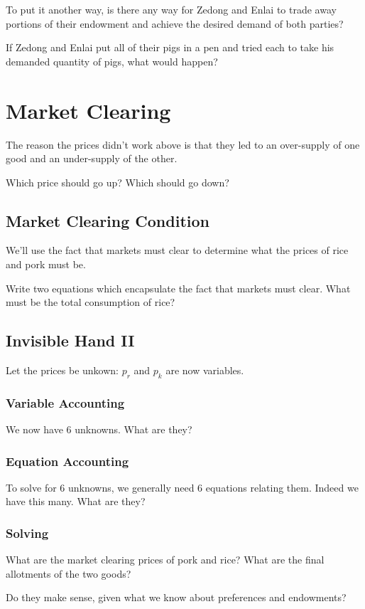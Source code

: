 \documentclass{article}
\begin{document}
To put it another way, is there any way for Zedong and Enlai to trade away portions of their endowment and achieve the desired demand of both parties?

If Zedong and Enlai put all of their pigs in a pen and tried each to take his demanded quantity of pigs, what would happen?

\section{Market Clearing}

The reason the prices didn't work above is that they led to an over-supply of one good and an under-supply of the other. 

Which price should go up? Which should go down?

\subsection{Market Clearing Condition}

We'll use the fact that markets must clear to determine what the prices of rice and pork must be.

Write two equations which encapsulate the fact that markets must clear. What must be the total consumption of rice?

\subsection{Invisible Hand II} 

Let the prices be unkown: $p_r$ and $p_k$ are now variables.

\subsubsection{Variable Accounting}

We now have 6 unknowns. What are they?

\subsubsection{Equation Accounting}

To solve for 6 unknowns, we generally need 6 equations relating them. Indeed we have this many. What are they?

\subsubsection{Solving}

What are the market clearing prices of pork and rice? What are the final allotments of the two goods?

Do they make sense, given what we know about preferences and endowments?
\end{document}
